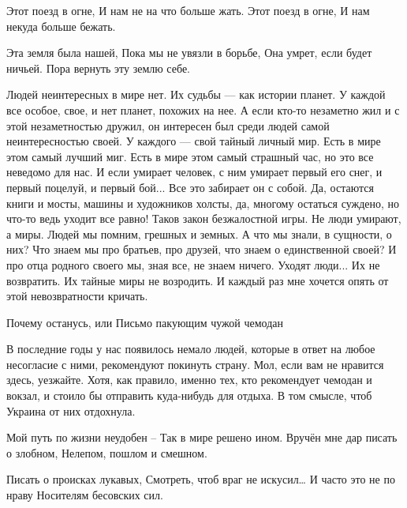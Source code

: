  
 
 
 
 

Этот поезд в огне,
И нам не на что больше жать.
Этот поезд в огне,
И нам некуда больше бежать.

Эта земля была нашей,
Пока мы не увязли в борьбе,
Она умрет, если будет ничьей.
Пора вернуть эту землю себе.


Людей неинтересных в мире нет.
Их судьбы — как истории планет.
У каждой все особое, свое,
и нет планет, похожих на нее.
А если кто-то незаметно жил
и с этой незаметностью дружил,
он интересен был среди людей
самой неинтересностью своей.
У каждого — свой тайный личный мир.
Есть в мире этом самый лучший миг.
Есть в мире этом самый страшный час,
но это все неведомо для нас.
И если умирает человек,
с ним умирает первый его снег,
и первый поцелуй, и первый бой...
Все это забирает он с собой.
Да, остаются книги и мосты,
машины и художников холсты,
да, многому остаться суждено,
но что-то ведь уходит все равно!
Таков закон безжалостной игры.
Не люди умирают, а миры.
Людей мы помним, грешных и земных.
А что мы знали, в сущности, о них?
Что знаем мы про братьев, про друзей,
что знаем о единственной своей?
И про отца родного своего
мы, зная все, не знаем ничего.
Уходят люди... Их не возвратить.
Их тайные миры не возродить.
И каждый раз мне хочется опять
от этой невозвратности кричать.

Почему останусь, или Письмо пакующим чужой чемодан

В последние годы у нас появилось немало людей, которые в ответ на любое
несогласие с ними, рекомендуют покинуть страну. Мол, если вам не нравится
здесь, уезжайте. Хотя, как правило, именно тех, кто рекомендует чемодан и
вокзал, и стоило бы отправить куда-нибудь для отдыха. В том смысле, чтоб
Украина от них отдохнула.

Мой путь по жизни неудобен – 
Так в мире решено ином.
Вручён мне дар писать о злобном,
Нелепом, пошлом и смешном.

Писать о происках лукавых,
Смотреть, чтоб враг не искусил…
И часто это не по нраву
Носителям бесовских сил.

